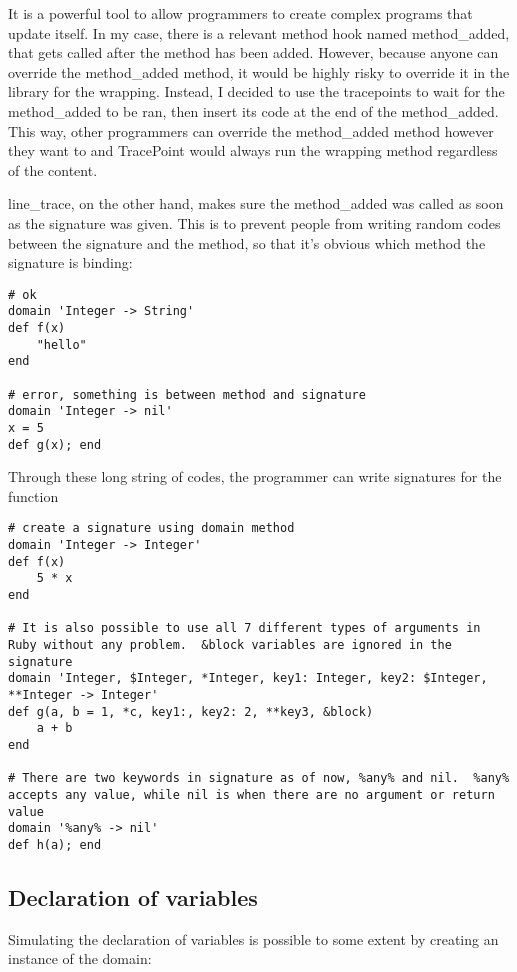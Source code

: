 It is a powerful tool to allow programmers to create complex programs that update itself.  In my case, there is a relevant method hook named method\_added, that gets called after the method has been added.  However, because anyone can override the method\_added method, it would be highly risky to override it in the library for the wrapping.  Instead, I decided to use the tracepoints to wait for the method\_added to be ran, then insert its code at the end of the method\_added.  This way, other programmers can override the method\_added method however they want to and TracePoint would always run the wrapping method regardless of the content.

line\_trace, on the other hand, makes sure the method\_added was called as soon as the signature was given.  This is to prevent people from writing random codes between the signature and the method, so that it's obvious which method the signature is binding:

\begin{lstlisting}[caption={Error example}]
# ok
domain 'Integer -> String'
def f(x)
    "hello"
end

# error, something is between method and signature
domain 'Integer -> nil'
x = 5
def g(x); end
\end{lstlisting}

Through these long string of codes, the programmer can write signatures for the function

\begin{lstlisting}[caption={Signature demo}]
# create a signature using domain method
domain 'Integer -> Integer'
def f(x)
    5 * x
end

# It is also possible to use all 7 different types of arguments in Ruby without any problem.  &block variables are ignored in the signature
domain 'Integer, $Integer, *Integer, key1: Integer, key2: $Integer, **Integer -> Integer'
def g(a, b = 1, *c, key1:, key2: 2, **key3, &block)
    a + b
end

# There are two keywords in signature as of now, %any% and nil.  %any% accepts any value, while nil is when there are no argument or return value
domain '%any% -> nil'
def h(a); end
\end{lstlisting}

\subsection{Declaration of variables}

Simulating the declaration of variables is possible to some extent by creating an instance of the domain:

